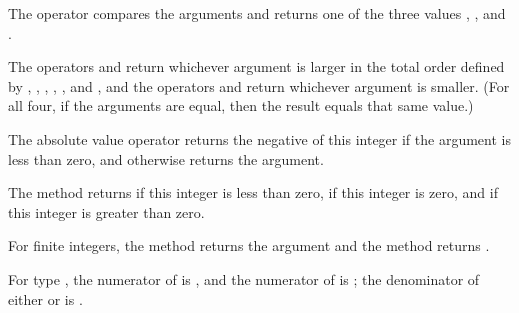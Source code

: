 The  operator compares the arguments and returns one of the three values
, , and .



The operators  and  return whichever argument is larger
in the total order defined by \EXP{<}, \EXP{\leq}, \EXP{=}, \EXP{\geq}, \EXP{>}, and ,
and the operators  and  return whichever argument is smaller.
(For all four, if the arguments are equal, then the result equals that same value.)



The absolute value operator \EXP{\left|\ldots\right|} returns the negative of this integer
if the argument is less than zero, and otherwise returns the argument.



The method  returns  if this integer is less than zero,
 if this integer is zero, and  if this integer is greater than zero.



For finite integers, the method  returns the argument
and the method  returns .

For type ,
the numerator of \EXP{+\infty} is ,
and the numerator of \EXP{-\infty} is ;
the denominator of either \EXP{+\infty} or \EXP{-\infty} is .



